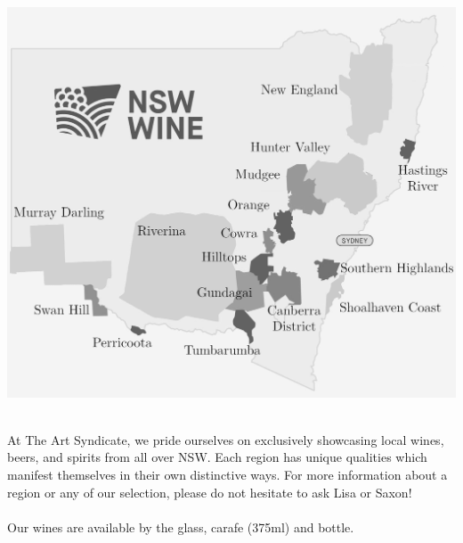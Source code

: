 \documentclass[
    pdflatex,
    fontsize=8pt,
    draft=true,
    twoside
]{article}
\begin{document}
\newpage
\begin{centering}
    \includegraphics[width=\textwidth]{Wine Map.png}
\end{centering}
\\
At The Art Syndicate, we pride ourselves on exclusively showcasing local wines, beers, and spirits from all over NSW. Each region has unique qualities which manifest themselves in their own distinctive ways. For more information about a region or any of our selection, please do not hesitate to ask Lisa or Saxon!
\\\\
Our wines are available by the glass, carafe (375ml) and bottle. 
\newpage





\newpage

\end{document}
